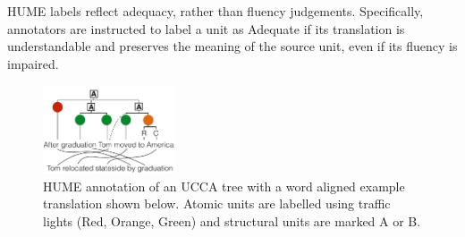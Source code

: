 \documentclass[11pt,letterpaper]{article}
\newcommand{\com}[1]{}
\newcommand{\figref}[1]{Figure~\ref{#1}}
\begin{document}
HUME labels reflect adequacy, rather than fluency judgements.
Specifically, annotators are instructed to
label a unit as Adequate if its translation is understandable and preserves
the meaning of the source unit, even if its fluency is impaired.

\com{
In non-configurational languages, the relationship between the
governing and dependent units is often expressed using morphological
properties of the dependants instead of their ordering
(this holds especially for the verb and its modifiers,
less so for components of noun phrases). Errors in morphology
should be expressed on the atomic units, so HUME can behave differently
on configurational vs. non-configurational languages.
}




\begin{figure}
    \begin{center}
    \includegraphics[width=0.35\textwidth]{ucca-tree-mteval-v3.png}
    \end{center}
  \caption{\label{fig:hume_tree_v2}
     HUME annotation of an UCCA tree with a word aligned example translation shown below. 
     Atomic units are labelled using traffic lights (Red, Orange, Green) and structural
     units are marked A or B.}
\end{figure}
\end{document}
